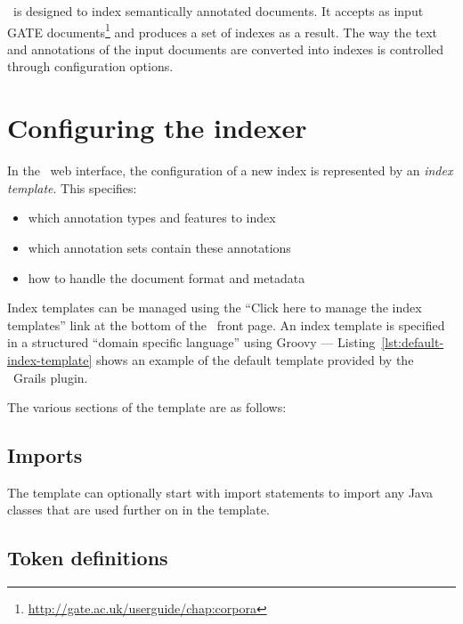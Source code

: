 \Mimir\ is designed to index semantically annotated documents. It accepts as
input GATE documents\footnote{\url{http://gate.ac.uk/userguide/chap:corpora}}
and produces a set of indexes as a result. The way the text and annotations of
the input documents are converted into indexes is controlled through
configuration options.

\section{Configuring the indexer}

In the \Mimir\ web interface, the configuration of a new index is represented
by an {\em index template}.  This specifies:
\begin{itemize}
\item which annotation types and features to index
\item which annotation sets contain these annotations
\item how to handle the document format and metadata
\end{itemize}

Index templates can be managed using the ``Click here to manage the index
templates'' link at the bottom of the \Mimir\ front page.  An index template is
specified in a structured ``domain specific language'' using Groovy ---
Listing~\ref{lst:default-index-template} shows an example of the default
template provided by the \Mimir\ Grails plugin.
%
%
\newcommand{\defaultIndexTemplate}[1][]{{%
}}%
%
\defaultIndexTemplate[float=htb,%
    caption={The default index template provided with \Mimir},%
    label=lst:default-index-template,%
]

{\newpage}
The various sections of the template are as follows:

\subsection*{Imports}
\defaultIndexTemplate[linerange=1-3,firstnumber=1]

The template can optionally start with import statements to import any Java
classes that are used further on in the template.

\subsection*{Token definitions}\label{sec:indexing:tokens}
\defaultIndexTemplate[linerange=5-11,firstnumber=5]

